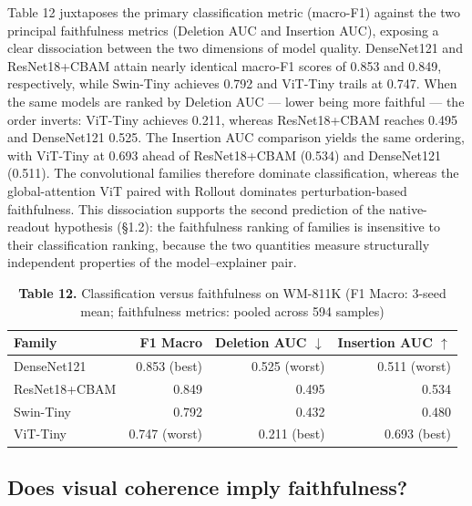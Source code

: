 \documentclass[11pt,a4paper]{article}
\begin{document}
Table 12 juxtaposes the primary classification metric (macro-F1) against the two principal faithfulness metrics (Deletion AUC and Insertion AUC), exposing a clear dissociation between the two dimensions of model quality. DenseNet121 and ResNet18+CBAM attain nearly identical macro-F1 scores of 0.853 and 0.849, respectively, while Swin-Tiny achieves 0.792 and ViT-Tiny trails at 0.747. When the same models are ranked by Deletion AUC --- lower being more faithful --- the order inverts: ViT-Tiny achieves 0.211, whereas ResNet18+CBAM reaches 0.495 and DenseNet121 0.525. The Insertion AUC comparison yields the same ordering, with ViT-Tiny at 0.693 ahead of ResNet18+CBAM (0.534) and DenseNet121 (0.511). The convolutional families therefore dominate classification, whereas the global-attention ViT paired with Rollout dominates perturbation-based faithfulness. This dissociation supports the second
prediction of the native-readout hypothesis (\S{}1.2): the faithfulness ranking of families is insensitive to their classification ranking, because the two quantities measure structurally independent properties of the model--explainer pair.

\begin{table}[htbp]
\centering
\small
\caption{\textbf{Table 12.} Classification versus faithfulness on WM-811K (F1 Macro: 3-seed mean; faithfulness metrics: pooled across 594 samples)}
\begin{tabular}{lrrr}
\toprule
Family & F1 Macro & Deletion AUC $\downarrow$ & Insertion AUC $\uparrow$ \\
\midrule
DenseNet121 & 0.853 (best) & 0.525 (worst) & 0.511 (worst) \\
ResNet18+CBAM & 0.849 & 0.495 & 0.534 \\
Swin-Tiny & 0.792 & 0.432 & 0.480 \\
ViT-Tiny & 0.747 (worst) & 0.211 (best) & 0.693 (best) \\
\bottomrule
\end{tabular}
\end{table}

\subsection{Does visual coherence imply faithfulness?}
\end{document}

